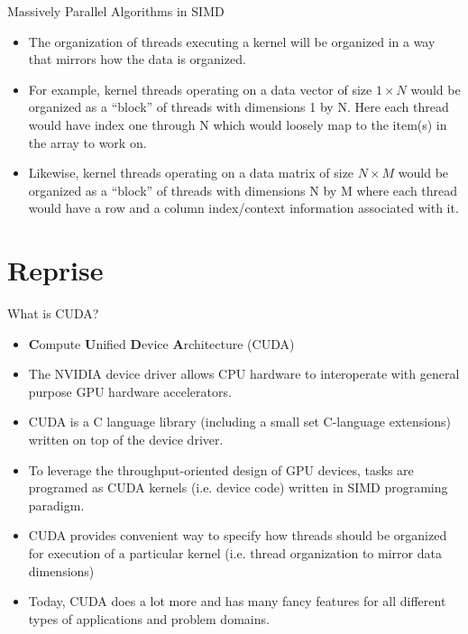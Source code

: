 \documentclass[handout]{beamer}
\begin{document}
\begin{frame}{Massively Parallel Algorithms in SIMD}
\begin{itemize}
	\item<1->The organization of threads executing a kernel will be organized in a way that mirrors how the data is organized.
	\item<2->For example, kernel threads operating on a data vector of size $1 \times N$ would be organized as a ``block'' of threads with dimensions 1 by N.  Here each thread would have index one through N which would loosely map to the item(s) in the array to work on. 
	\item<3->Likewise, kernel threads operating on a data matrix of size $N \times M$ would be organized as a ``block'' of threads with dimensions N by M where each thread would have a row and a column index/context information associated with it.  
\end{itemize}
\end{frame}

\section{Reprise}
\begin{frame}{What is CUDA?}
\begin{itemize}
	\item<1->\textbf{C}ompute \textbf{U}nified \textbf{D}evice \textbf{A}rchitecture (CUDA)
	\item<2->The NVIDIA device driver allows CPU hardware to interoperate with general purpose GPU hardware accelerators.
	\item<3->CUDA is a C language library (including a small set C-language extensions) written on top of the device driver.
	\item<4->To leverage the throughput-oriented design of GPU devices, tasks are programed as CUDA kernels (i.e. device code) written in SIMD programing paradigm. 
	\item<5->CUDA provides convenient way to specify how threads should be organized for execution of a particular kernel (i.e. thread organization to mirror data dimensions)
	\item<6-> Today, CUDA does a lot more and has many fancy features for all different types of applications and problem domains. 
\end{itemize}
\end{frame}

%
%
%
%	
%	
%	
%
\end{document}
